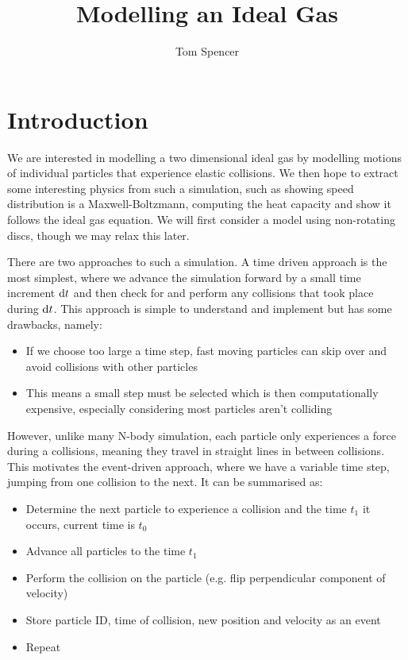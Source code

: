 \documentclass{article}
\title{Modelling an Ideal Gas}
\author{Tom Spencer}
\newcommand{\diff}{\textnormal{d}}
\begin{document}
\maketitle

\section{Introduction}
We are interested in modelling a two dimensional ideal gas by modelling motions of individual particles that experience elastic collisions. We then hope to extract some interesting physics from such a simulation, such as showing speed distribution is a Maxwell-Boltzmann, computing the heat capacity and show it follows the ideal gas equation. We will first consider a model using non-rotating discs, though we may relax this later.

There are two approaches to such a simulation. A time driven approach is the most simplest, where we advance the simulation forward by a small time increment $\diff t$ and then check for and perform any collisions that took place during $\diff t$. This approach is simple to understand and implement but has some drawbacks, namely:
\begin{itemize}
    \item If we choose too large a time step, fast moving particles can skip over and avoid collisions with other particles
    \item This means a small step must be selected which is then computationally expensive, especially considering most particles aren't colliding
\end{itemize}

However, unlike many N-body simulation, each particle only experiences a force during a collisions, meaning they travel in straight lines in between collisions. This motivates the event-driven approach, where we have a variable time step, jumping from one collision to the next. It can be summarised as:
\begin{itemize}
    \item Determine the next particle to experience a collision and the time $t_1$ it occurs, current time is $t_0$
    \item Advance all particles to the time $t_1$
    \item Perform the collision on the particle (e.g. flip perpendicular component of velocity)
    \item Store particle ID, time of collision, new position and velocity as an event
    \item Repeat
\end{itemize}
\end{document}
